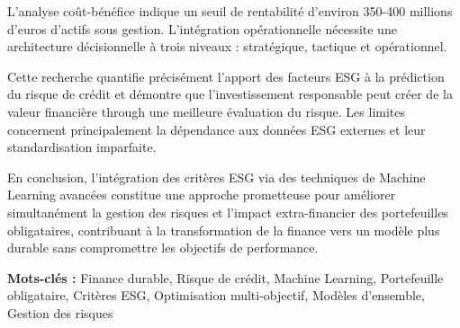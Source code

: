 L'analyse coût-bénéfice indique un seuil de rentabilité d'environ 350-400 millions d'euros d'actifs sous gestion. L'intégration opérationnelle nécessite une architecture décisionnelle à trois niveaux : stratégique, tactique et opérationnel.

Cette recherche quantifie précisément l'apport des facteurs ESG à la prédiction du risque de crédit et démontre que l'investissement responsable peut créer de la valeur financière through une meilleure évaluation du risque. Les limites concernent principalement la dépendance aux données ESG externes et leur standardisation imparfaite.

En conclusion, l'intégration des critères ESG via des techniques de Machine Learning avancées constitue une approche prometteuse pour améliorer simultanément la gestion des risques et l'impact extra-financier des portefeuilles obligataires, contribuant à la transformation de la finance vers un modèle plus durable sans compromettre les objectifs de performance.

\textbf{Mots-clés :} Finance durable, Risque de crédit, Machine Learning, Portefeuille obligataire, Critères ESG, Optimisation multi-objectif, Modèles d'ensemble, Gestion des risques